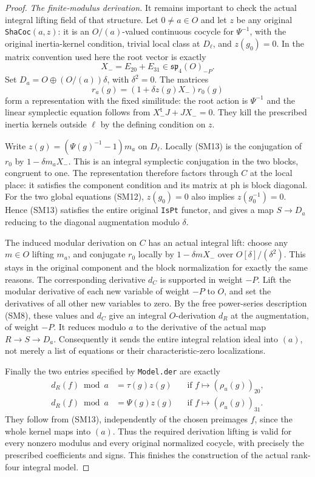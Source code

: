 \begin{proof}
\emph{The finite-modulus derivation.}
It remains important to check the actual integral
lifting field of that structure. Let \(0\ne a\in O\)
and let \(z\) be any original \texttt{ShaCoc}\((a,z)\):
it is an \(O/(a)\)-valued continuous cocycle for
\(\Psi^{-1}\), with the original inertia-kernel
condition, trivial local class at \(D_\ell\), and
\(z(g_0)=0\). In the matrix convention used here
the root vector is exactly
\[
 X_-=E_{20}+E_{31}\in\mathfrak{sp}_4(O)_{-P}.
\]
Set \(D_a=O\oplus(O/(a))\delta\), with \(\delta^2=0\).
The matrices
\[
 r_a(g)=(1+\delta z(g)X_-)r_0(g)                              \tag{SM13}
\]
form a representation with the fixed similitude:
the root action is \(\Psi^{-1}\) and the
linear symplectic equation follows from
\(X_-^{\mathsf t}J+JX_-=0\).
They kill the prescribed inertia kernels outside
\(\ell\) by the defining condition on \(z\).

Write \(z(g)=(\Psi(g)^{-1}-1)m_a\) on \(D_\ell\).
Locally (SM13) is the conjugation of \(r_0\) by
\(1-\delta m_aX_-\). This is an integral symplectic
conjugation in the two blocks, congruent to one.
The representation therefore factors through \(C\)
at the local place: it satisfies the component
condition and its matrix at \(\mathrm{ph}\) is
block diagonal. For the two global equations (SM12),
\(z(g_0)=0\) also implies \(z(g_0^{-1})=0\).
Hence (SM13) satisfies the entire original
\texttt{IsPt} functor, and gives a map \(S\to D_a\)
reducing to the diagonal augmentation modulo \(\delta\).

The induced modular derivation on \(C\) has an actual
integral lift: choose any \(m\in O\) lifting \(m_a\),
and conjugate \(r_0\) locally by \(1-\delta mX_-\)
over \(O[\delta]/(\delta^2)\).
This stays in the original component and the block
normalization for exactly the same reasons. The
corresponding derivative \(d_C\) is supported in
weight \(-P\). Lift the modular derivative of each
new variable of weight \(-P\) to \(O\), and set the
derivatives of all other new variables to zero.
By the free power-series description (SM8), these
values and \(d_C\) give an integral \(O\)-derivation
\(d_R\) at the augmentation, of weight \(-P\).
It reduces modulo \(a\) to the derivative of the
actual map \(R\to S\to D_a\). Consequently it sends
the entire integral relation ideal into \((a)\),
not merely a list of equations or their
characteristic-zero localizations.

Finally the two entries specified by \texttt{Model.der}
are exactly
\[
 \begin{aligned}
 d_R(f)\bmod a&=\tau(g)z(g)
       &&\text{if }f\mapsto(\rho_u(g))_{20},\\
 d_R(f)\bmod a&=\Psi(g)z(g)
       &&\text{if }f\mapsto(\rho_u(g))_{31}.
 \end{aligned}                                                 \tag{SM14}
\]
They follow from (SM13), independently of the chosen
preimages \(f\), since the whole kernel maps into
\((a)\). Thus the required derivation lifting is
valid for every nonzero modulus and every original
normalized cocycle, with precisely the prescribed
coefficients and signs. This finishes the construction
of the actual rank-four integral model.
\end{proof}

